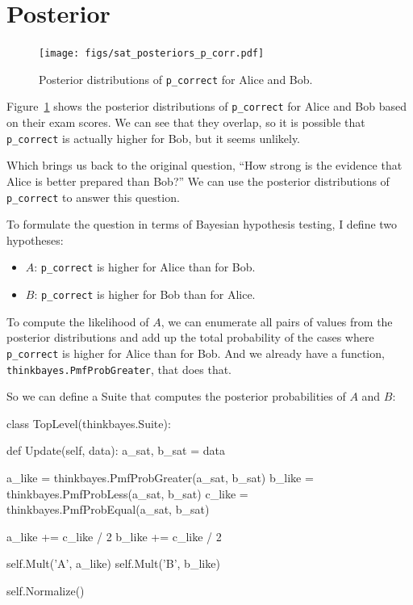 \documentclass[12pt]{book}
\theoremstyle{exercise}
\newcommand{\py}[1]{{\tt #1}}%
\begin{document}
\section{Posterior}

\begin{figure}
\centerline{\texttt{[image: figs/sat\_posteriors\_p\_corr.pdf]}}
\caption{Posterior distributions of \py{p_correct} for Alice and Bob.}
\label{fig.satposterior1}
\end{figure}

Figure~\ref{fig.satposterior1} shows the posterior distributions
of \verb"p_correct" for Alice and Bob based on their exam scores.
We can see that they overlap, so it is possible that \verb"p_correct"
is actually higher for Bob, but it seems unlikely.

Which brings us back to the original question, ``How strong is the
evidence that Alice is better prepared than Bob?''  We can use the
posterior distributions of \verb"p_correct" to answer this question.

To formulate the question in terms of Bayesian hypothesis testing,
I define two hypotheses:

\begin{itemize}

\item $A$: \verb"p_correct" is higher for Alice than for Bob.

\item $B$: \verb"p_correct" is higher for Bob than for Alice.

\end{itemize}

To compute the likelihood of $A$, we can enumerate all pairs of values
from the posterior distributions and add up the total probability of
the cases where \verb"p_correct" is higher for Alice than for Bob.
And we already have a function, \verb"thinkbayes.PmfProbGreater",
that does that.

So we can define a Suite that computes the posterior probabilities
of $A$ and $B$:

\begin{code}
class TopLevel(thinkbayes.Suite):

    def Update(self, data):
        a_sat, b_sat = data

        a_like = thinkbayes.PmfProbGreater(a_sat, b_sat)
        b_like = thinkbayes.PmfProbLess(a_sat, b_sat)
        c_like = thinkbayes.PmfProbEqual(a_sat, b_sat)

        a_like += c_like / 2
        b_like += c_like / 2

        self.Mult('A', a_like)
        self.Mult('B', b_like)

        self.Normalize()
\end{code}
\end{document}
